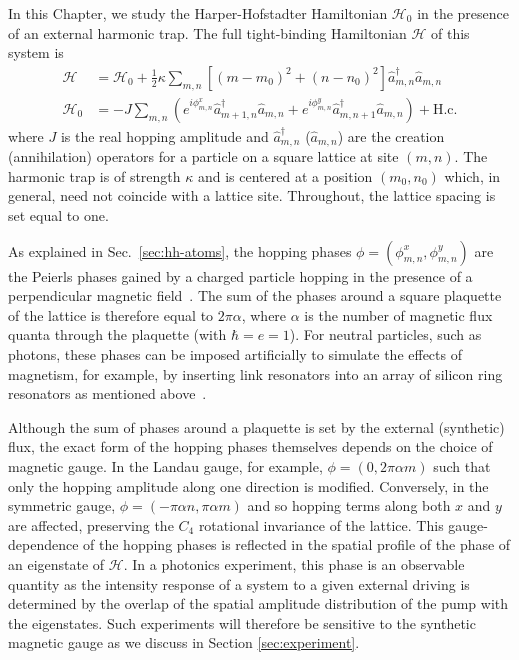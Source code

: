 In this Chapter, we study the Harper-Hofstadter Hamiltonian
$\mathcal{H}_0$ in the presence of an external harmonic trap. The full
tight-binding Hamiltonian $\mathcal{H}$ of this system is
%
\begin{align} \mathcal{H} &= \mathcal{H}_0+\frac{1}{2}\kappa
\sum_{m,n}\left[(m-m_0)^{2}+(n-n_0)^{2}\right]\hat{a}_{m,n}^{\dagger}\hat{a}_{m,n} \label{eq:model}\\
\mathcal{H}_0 &= -J\sum_{m,n}(e^{i
\phi_{m,n}^x}\hat{a}_{m+1,n}^{\dagger}\hat{a}_{m,n} +e^{i
\phi_{m,n}^y}\hat{a}_{m,n+1}^{\dagger}\hat{a}_{m,n}) +
\text{H.c.} \label{eq:hh_hamiltonian}
\end{align}
%
where $J$ is the real hopping amplitude and $\hat{a}_{m,n}^{\dagger}$
($\hat{a}_{m,n}$) are the creation (annihilation) operators for a
particle on a square lattice at site $(m,n)$. The harmonic trap is of
strength $\kappa$ and is centered at a position $(m_0, n_0)$ which, in
general, need not coincide with a lattice site. Throughout, the
lattice spacing is set equal to one.

As explained in Sec.~\ref{sec:hh-atoms}, the hopping phases
$\phi = (\phi_{m,n}^x, \phi_{m,n}^y)$ are the Peierls phases gained by
a charged particle hopping in the presence of a perpendicular magnetic
field~\cite{harper1955magnetic,hofstadter1976butterfly}. The sum of
the phases around a square plaquette of the lattice is therefore equal
to $2\pi\alpha$, where $\alpha$ is the number of magnetic flux quanta
through the plaquette (with $\hbar=e=1$). For neutral particles, such
as photons, these phases can be imposed artificially to simulate the
effects of magnetism, for example, by inserting link resonators into
an array of silicon ring resonators as mentioned
above~\cite{hafezi2013imaging}.

Although the sum of phases around a plaquette is set by the external
(synthetic) flux, the exact form of the hopping phases themselves
depends on the choice of magnetic gauge. In the Landau gauge, for
example, $\phi = (0, 2\pi\alpha m)$ such that only the hopping
amplitude along one direction is modified. Conversely, in the
symmetric gauge, $\phi = (-\pi\alpha n, \pi\alpha m)$ and so hopping
terms along both $x$ and $y$ are affected, preserving the $C_4$
rotational invariance of the lattice. This gauge-dependence of the
hopping phases is reflected in the spatial profile of the phase of an
eigenstate of $\mathcal{H}$. In a photonics experiment, this phase is
an observable quantity as the intensity response of a system to a
given external driving is determined by the overlap of the spatial
amplitude distribution of the pump with the eigenstates. Such
experiments will therefore be sensitive to the synthetic magnetic
gauge as we discuss in Section \ref{sec:experiment}.

